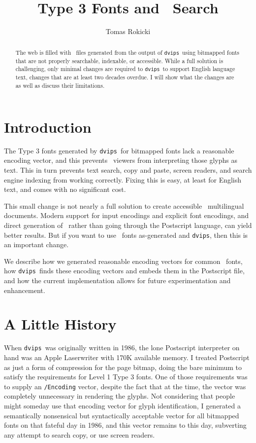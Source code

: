 \documentclass{ltugboat}
\title{Type 3 Fonts and \PDF\ Search}
\author{Tomas Rokicki}
\def\PDF{\acro{PDF}}
\def\dvips{\texttt{dvips}}
\begin{document}
\maketitle

\begin{abstract}
The web is filled with \PDF\ files generated from the output of
\dvips\ using bitmapped fonts that are not properly searchable,
indexable, or accessible.  While a full solution is challenging,
only minimal changes are required to \dvips\ to support
English language text, changes that are at least two decades overdue.
I will show what the changes are as well as discuss their
limitations.
\end{abstract}

\section{Introduction}

The Type 3 fonts generated by \dvips\ for bitmapped fonts
lack a reasonable encoding vector, and this prevents \PDF\ 
viewers from interpreting those glyphs as text.  This in turn
prevents text search, copy and paste, screen readers, and
search engine indexing from working correctly.  Fixing this is
easy, at least for English text, and comes with no significant
cost.

This small change is not nearly a full solution to create
accessible \PDF\ multilingual documents.  Modern support
for input encodings and explicit font encodings, and
direct generation of \PDF\ rather than going through the
Postscript language, can yield better results.  But if
you want to use \MF\ fonts as-generated and \dvips,
then this is an important change.

We describe how we generated reasonable encoding vectors
for common \MF\ fonts, how \dvips\ finds these
encoding vectors and embeds them in the Postscript file, and
how the current implementation allows for future
experimentation and enhancement.

\section{A Little History}

When \dvips\ was originally written in 1986, the lone
Postscript interpreter on hand was an Apple Laserwriter with
170K available memory.  I treated Postscript as just a form of
compression for the page bitmap, doing the bare minimum to
satisfy the requirements for Level 1 Type 3 fonts.  One of
those requirements was to supply an \texttt{/Encoding} vector,
despite the fact that at the time, the vector was completely
unnecessary in rendering the glyphs.  Not considering that people
might someday use that encoding vector for glyph identification,
I generated a semantically nonsensical but syntactically acceptable
vector for all bitmapped fonts on that fateful day in 1986, and
this vector remains to this day, subverting any attempt to search
copy, or use screen readers.
\end{document}

